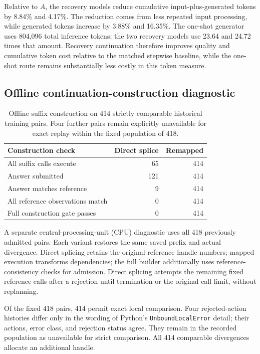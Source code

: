 \documentclass[a4paper,12pt]{article}
\begin{document}
Relative to $A$, the recovery models reduce cumulative input-plus-generated tokens by 8.84\% and 4.17\%. The reduction comes from less repeated input processing, while generated tokens increase by 3.88\% and 16.35\%. The one-shot generator uses 804,096 total inference tokens; the two recovery models use 23.64 and 24.72 times that amount. Recovery continuation therefore improves quality and cumulative token cost relative to the matched stepwise baseline, while the one-shot route remains substantially less costly in this token measure.

\subsection{Offline continuation-construction diagnostic}

\begin{table}[htbp]
 \centering
 \caption{Offline suffix construction on 414 strictly comparable historical training pairs. Four further pairs remain explicitly unavailable for exact replay within the fixed population of 418.}
 \label{tab:construction-en}
 \begin{tabular}{@{}lrr@{}}
\toprule
Construction check & Direct splice & Remapped \\
\midrule
All suffix calls execute & 65 & 414 \\
Answer submitted & 121 & 414 \\
Answer matches reference & 9 & 414 \\
All reference observations match & 0 & 414 \\
Full construction gate passes & 0 & 414 \\
\bottomrule
\end{tabular}
\end{table}

A separate central-processing-unit (CPU) diagnostic uses all 418 previously admitted pairs. Each variant restores the same saved prefix and actual divergence. Direct splicing retains the original reference handle numbers; mapped execution transforms dependencies; the full builder additionally uses reference-consistency checks for admission. Direct splicing attempts the remaining fixed reference calls after a rejection until termination or the original call limit, without replanning.

Of the fixed 418 pairs, 414 permit exact local comparison. Four rejected-action histories differ only in the wording of Python's \texttt{UnboundLocalError} detail; their actions, error class, and rejection status agree. They remain in the recorded population as unavailable for strict comparison. All 414 comparable divergences allocate an additional handle.
\end{document}
